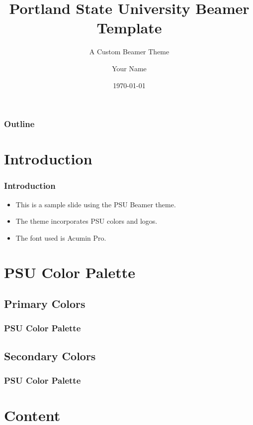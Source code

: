 \documentclass{beamer}
\title{Portland State University Beamer Template}
\subtitle{A Custom Beamer Theme}
\author{Your Name}
\institute{Portland State University}
\date{\today}
\begin{document}
    {
    \begin{frame}
		\titlepage
	\end{frame}
    }

    \begin{frame}
        \frametitle{Outline}
        \tableofcontents
    \end{frame}

    \section{Introduction}
	\begin{frame}
		\frametitle{Introduction}
		\begin{itemize}
			\item This is a sample slide using the PSU Beamer theme.

			\item The theme incorporates PSU colors and logos.

			\item The font used is Acumin Pro.
		\end{itemize}
	\end{frame}

    \section{PSU Color Palette}
    \subsection{Primary Colors}
	\begin{frame}
		\frametitle{PSU Color Palette}
		\showPSUColorsPrimary
	\end{frame}

    \subsection{Secondary Colors}
	\begin{frame}
		\frametitle{PSU Color Palette}
		\showPSUColorsSecondary
	\end{frame}

    \section{Content}
\end{document}
